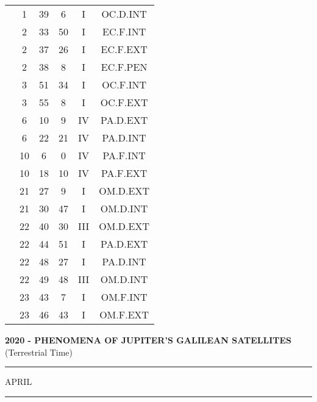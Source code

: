 \documentclass[12pt, a4paper]{article}
\begin{document}
\begin{multicols}{3}
{\begin{tabular}{c c c c c c}
	 	 	 	 & 1 & 39 & 6 & I & OC.D.INT\\%
	 	 	 	 & 2 & 33 & 50 & I & EC.F.INT\\%
	 	 	 	 & 2 & 37 & 26 & I & EC.F.EXT\\%
	 	 	 	 & 2 & 38 & 8 & I & EC.F.PEN\\%
	 	 	 	 & 3 & 51 & 34 & I & OC.F.INT\\%
	 	 	 	 & 3 & 55 & 8 & I & OC.F.EXT\\%
	 	 	 	 & 6 & 10 & 9 & IV & PA.D.EXT\\%
	 	 	 	 & 6 & 22 & 21 & IV & PA.D.INT\\%
	 	 	 	 & 10 & 6 & 0 & IV & PA.F.INT\\%
	 	 	 	 & 10 & 18 & 10 & IV & PA.F.EXT\\%
	 	 	 	 & 21 & 27 & 9 & I & OM.D.EXT\\%
	 	 	 	 & 21 & 30 & 47 & I & OM.D.INT\\%
	 	 	 	 & 22 & 40 & 30 & III & OM.D.EXT\\%
	 	 	 	 & 22 & 44 & 51 & I & PA.D.EXT\\%
	 	 	 	 & 22 & 48 & 27 & I & PA.D.INT\\%
	 	 	 	 & 22 & 49 & 48 & III & OM.D.INT\\%
	 	 	 	 & 23 & 43 & 7 & I & OM.F.INT\\%
	 	 	 	 & 23 & 46 & 43 & I & OM.F.EXT\\%
	 	 \end{tabular}
 	}
\end{multicols}
\textbf{2020 - PHENOMENA OF JUPITER'S GALILEAN SATELLITES}\\(Terrestrial Time) 
\vspace{0.1cm} \hrule \vspace{0.1cm}
APRIL\vspace{0.1cm}
\hrule
\vspace{-0.2cm}
\end{document}
